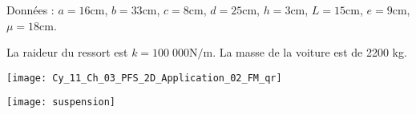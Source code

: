 
Données : $a = 16 \text{cm}$, $b = 33 \text{cm}$, $c = 8 \text{cm}$, $d = 25 \text{cm}$, $h = 3 \text{cm}$, $L = 15 \text{cm}$, $e = 9 \text{cm}$, $\mu = 18 \text{cm}$. 

La raideur du ressort est $k = 100\;000 \text{N/m}$. La masse de la voiture est de 2200 kg.


\ifprof
\else
\begin{marginfigure}
\centering
\texttt{[image: Cy\_11\_Ch\_03\_PFS\_2D\_Application\_02\_FM\_qr]}
\end{marginfigure}
\fi

\begin{center}
\texttt{[image: suspension]}
\end{center}

